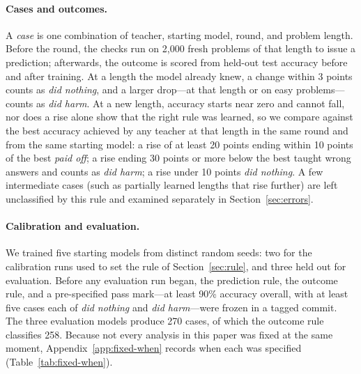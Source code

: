 \paragraph{Cases and outcomes.}
A \emph{case} is one combination of teacher, starting model, round, and problem
length. Before the round, the checks run on 2,000 fresh problems of that length
to issue a prediction; afterwards, the outcome is scored from held-out test
accuracy before and after training. At a length the model already knew, a
change within 3 points counts as \emph{did nothing}, and a larger drop---at
that length or on easy problems---counts as \emph{did harm}. At a new length,
accuracy starts near zero and cannot fall, nor does a rise alone show that the
right rule was learned, so we compare against the best accuracy achieved by any
teacher at that length in the same round and from the same starting model: a
rise of at least 20 points ending within 10 points of the best \emph{paid off};
a rise ending 30 points or more below the best taught wrong answers and counts
as \emph{did harm}; a rise under 10 points \emph{did nothing}. A few
intermediate cases (such as partially learned lengths that rise further) are
left unclassified by this rule and examined separately in
Section~\ref{sec:errors}.

\paragraph{Calibration and evaluation.}
We trained five starting models from distinct random seeds: two for the
calibration runs used to set the rule of Section~\ref{sec:rule}, and three held
out for evaluation. Before any evaluation run began, the prediction rule, the
outcome rule, and a pre-specified pass mark---at least 90\% accuracy overall,
with at least five cases each of \emph{did nothing} and \emph{did harm}---were
frozen in a tagged commit. The three evaluation models produce 270 cases, of
which the outcome rule classifies 258. Because not every analysis in this paper
was fixed at the same moment, Appendix~\ref{app:fixed-when} records when
each was specified (Table~\ref{tab:fixed-when}).
